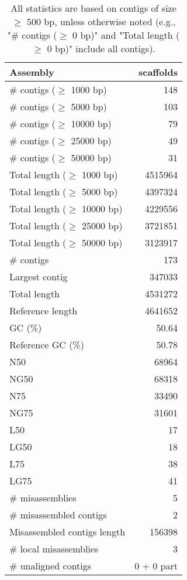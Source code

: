 \documentclass[12pt,a4paper]{article}
\begin{document}
\begin{table}[ht]
\begin{center}
\caption{All statistics are based on contigs of size $\geq$ 500 bp, unless otherwise noted (e.g., "\# contigs ($\geq$ 0 bp)" and "Total length ($\geq$ 0 bp)" include all contigs).}
\begin{tabular}{|l*{1}{|r}|}
\hline
Assembly & scaffolds \\ \hline
\# contigs ($\geq$ 1000 bp) & 148 \\ \hline
\# contigs ($\geq$ 5000 bp) & 103 \\ \hline
\# contigs ($\geq$ 10000 bp) & 79 \\ \hline
\# contigs ($\geq$ 25000 bp) & 49 \\ \hline
\# contigs ($\geq$ 50000 bp) & 31 \\ \hline
Total length ($\geq$ 1000 bp) & 4515964 \\ \hline
Total length ($\geq$ 5000 bp) & 4397324 \\ \hline
Total length ($\geq$ 10000 bp) & 4229556 \\ \hline
Total length ($\geq$ 25000 bp) & 3721851 \\ \hline
Total length ($\geq$ 50000 bp) & 3123917 \\ \hline
\# contigs & 173 \\ \hline
Largest contig & 347033 \\ \hline
Total length & 4531272 \\ \hline
Reference length & 4641652 \\ \hline
GC (\%) & 50.64 \\ \hline
Reference GC (\%) & 50.78 \\ \hline
N50 & 68964 \\ \hline
NG50 & 68318 \\ \hline
N75 & 33490 \\ \hline
NG75 & 31601 \\ \hline
L50 & 17 \\ \hline
LG50 & 18 \\ \hline
L75 & 38 \\ \hline
LG75 & 41 \\ \hline
\# misassemblies & 5 \\ \hline
\# misassembled contigs & 2 \\ \hline
Misassembled contigs length & 156398 \\ \hline
\# local misassemblies & 3 \\ \hline
\# unaligned contigs & 0 + 0 part \\ \hline

\end{tabular}
\end{center}
\end{table}
\end{document}
